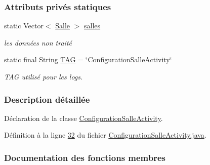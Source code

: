 \subsubsection*{Attributs privés statiques}
\begin{DoxyCompactItemize}
\item 
static Vector$<$ \hyperlink{classcom_1_1lasalle_1_1meeting_1_1_salle}{Salle} $>$ \hyperlink{classcom_1_1lasalle_1_1meeting_1_1_configuration_salle_activity_afe3082468b9dd31ba0ec92e22bf27ab8}{salles}
\begin{DoxyCompactList}\small\item\em les données non traité \end{DoxyCompactList}\item 
static final String \hyperlink{classcom_1_1lasalle_1_1meeting_1_1_configuration_salle_activity_a55224a88c619aa44eb96c0febc3f1857}{T\+AG} = \char`\"{}Configuration\+Salle\+Activity\char`\"{}
\begin{DoxyCompactList}\small\item\em T\+AG utilisé pour les logs. \end{DoxyCompactList}\end{DoxyCompactItemize}


\subsubsection{Description détaillée}
Déclaration de la classe \hyperlink{classcom_1_1lasalle_1_1meeting_1_1_configuration_salle_activity}{Configuration\+Salle\+Activity}. 

Définition à la ligne \hyperlink{_configuration_salle_activity_8java_source_l00032}{32} du fichier \hyperlink{_configuration_salle_activity_8java_source}{Configuration\+Salle\+Activity.\+java}.



\subsubsection{Documentation des fonctions membres}
\mbox{\label{classcom_1_1lasalle_1_1meeting_1_1_configuration_salle_activity_a24314b86f87df50bb933484d1d1435ac}} 
